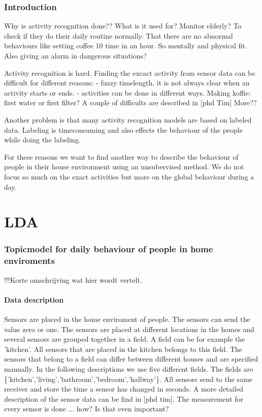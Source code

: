 \documentclass[11pt,a4paper]{report}
\begin{document}
\section{Introduction}

Why is activity recognition done?? What is it used for?
Monitor elderly? To check if they do their daily routine normally. That there are no abnormal behaviours like setting coffee 10 time in an hour.  So mentally and physical fit. Also giving an alarm in dangerous situations?

Activity recognition is hard. Finding the excact activity from sensor data can be difficult for different reasons:
- fuzzy timelength, it is not always clear when an activity starts or ends.
- activities can be done in different ways. Making koffie: first water or first filter?
A couple of difficults are described in [phd Tim] More??

Another problem is that many activity recognition models are based on labeled data. Labeling is timeconsuming and also effects the behaviour of the people while doing the labeling.

For these reasons we want to find another way to describe the behaviour of people in their house environment using an unsubervised method. We do not focus so much on the exact activities but more on the global behaviour during a day.



\part{LDA}
\section{Topicmodel for daily behaviour of people in home enviroments}
!!!Korte omschrijving wat hier wordt vertelt.


\subsection{Data description}
Sensors are placed in the home enviroment of people. The sensors can send the value zero or one. The sensors are placed at different locations in the homes and several sensors are grouped together in a field. A field can be for example the 'kitchen'. All sensors that are placed in the kitchen belongs to this field. The sensors that belong to a field can differ between different houses and are specified manually. In the following descriptions we use five different fields. The fields are \{'kitchen','living','bathroom','bedroom','hallway'\}.
All sensors send to the same receiver and store the time a sensor has changed in seconds. 
A more detailed description of the sensor data can be find in [phd tim]. The measurement for every sensor is done ... how? Is that even important? 
\end{document}

